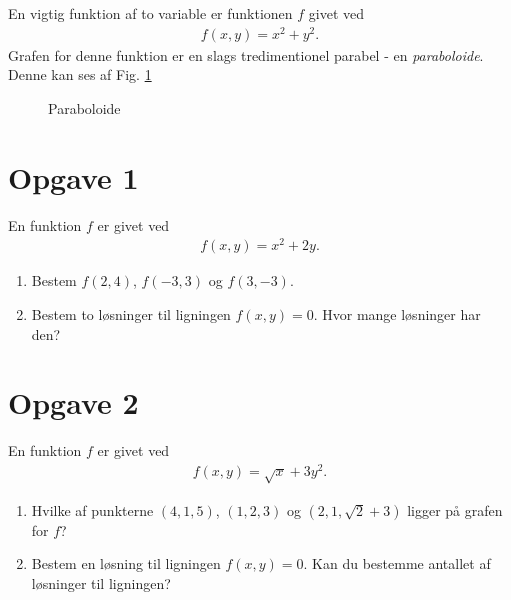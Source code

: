 \begin{exa}
	En vigtig funktion af to variable er funktionen $f$ givet ved
	\begin{align*}
		f(x,y) = x^2+y^2.
	\end{align*}
	Grafen for denne funktion er en slags tredimentionel parabel - en \textit{paraboloide}. Denne kan ses af Fig. \ref{fig:paraboloide}
		\begin{figure}[H]
		\centering
		\caption{Paraboloide}
		\label{fig:paraboloide}
	\end{figure}
\end{exa}

\section*{Opgave 1}
En funktion $f$ er givet ved
	\begin{align*}
		f(x,y) = x^2+2y.
	\end{align*}
\begin{enumerate}[label=\roman*)]
	\item Bestem $f(2,4)$, $f(-3,3)$ og $f(3,-3)$.
	\item Bestem to løsninger til ligningen $f(x,y) = 0$. Hvor mange løsninger har den?
\end{enumerate}
\section*{Opgave 2}
En funktion $f$ er givet ved 
\begin{align*}
	f(x,y) = \sqrt{x} + 3y^2.
\end{align*}
\begin{enumerate}[label=\roman*)]
	\item Hvilke af punkterne $(4,1,5)$, $(1,2,3)$ og $(2,1,\sqrt{2}+3)$ ligger på grafen for $f$?
	\item Bestem en løsning til ligningen $f(x,y) = 0$. Kan du bestemme antallet af løsninger til ligningen?
\end{enumerate}

